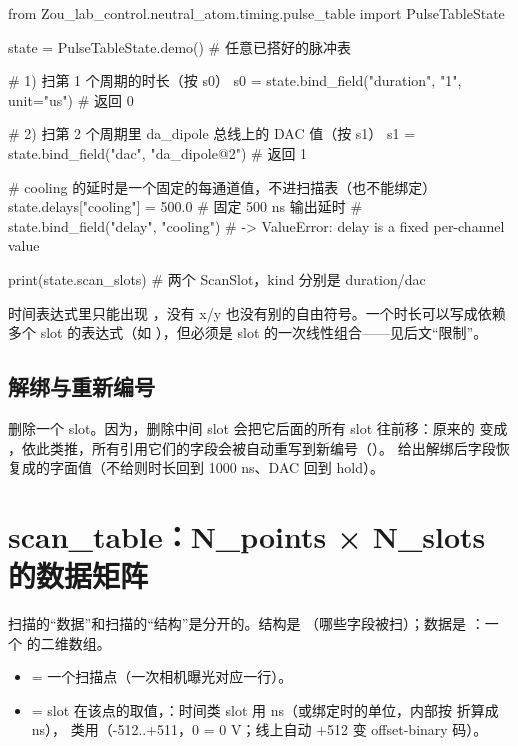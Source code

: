 \documentclass[11pt,oneside,openany]{book}
\begin{document}
\begin{codeblock}[Python]
from Zou_lab_control.neutral_atom.timing.pulse_table import PulseTableState

state = PulseTableState.demo()  # 任意已搭好的脉冲表

# 1) 扫第 1 个周期的时长（按 s0）
s0 = state.bind_field("duration", "1", unit="us")        # 返回 0

# 2) 扫第 2 个周期里 da_dipole 总线上的 DAC 值（按 s1）
s1 = state.bind_field("dac", "da_dipole@2")              # 返回 1

# cooling 的延时是一个固定的每通道值，不进扫描表（也不能绑定）
state.delays["cooling"] = 500.0                          # 固定 500 ns 输出延时
# state.bind_field("delay", "cooling")  # -> ValueError: delay is a fixed per-channel value

print(state.scan_slots)      # 两个 ScanSlot，kind 分别是 duration/dac
\end{codeblock}

\begin{notebox}
时间表达式里只能出现 ，没有 x/y 也没有别的自由符号。一个时长可以写成依赖多个 slot 的表达式（如 ），但必须是 slot 的一次线性组合——见后文“限制”。
\end{notebox}

\subsection{解绑与重新编号}

 删除一个 slot。因为，删除中间 slot 会把它后面的所有 slot 往前移：原来的  变成 ，依此类推，所有引用它们的字段会被自动重写到新编号（）。 给出解绑后字段恢复成的字面值（不给则时长回到 1000 ns、DAC 回到 hold）。

\section{scan\_table：N\_points × N\_slots 的数据矩阵}

扫描的“数据”和扫描的“结构”是分开的。结构是 （哪些字段被扫）；数据是 ：一个  的二维数组。

\begin{itemize}
\item {} = 一个扫描点（一次相机曝光对应一行）。
\item {} = slot  在该点的取值，：时间类 slot 用 ns（或绑定时的单位，内部按  折算成 ns）， 类用（-512..+511，0 = 0 V；线上自动 +512 变 offset-binary 码）。
\end{itemize}
\end{document}
